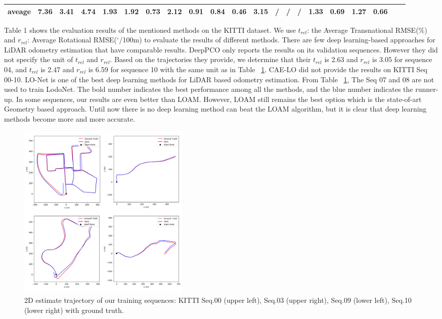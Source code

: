 \documentclass[sigconf]{acmart}
\def\lodo{LodoNet}
\begin{document}
\begin{table}
{\begin{tabular}{|c|cccccccccccccccccc|cc|}
aveage                & 7.36          & 3.41          & 4.74          & 1.93          & 1.92    & 0.73           & 2.12       & 0.91       & \textbf{0.84} & \textbf{0.46} & 3.15           & /              & /            & /            & 1.33            & 0.69     & {\color[HTML]{3166FF} 1.27} & {\color[HTML]{3166FF} 0.66} \\ \hline
\end{tabular}}
\label{tab:results}
\end{table}


Table 1 shows the evaluation results of the mentioned methods on the KITTI dataset. We use $t_{rel}$: the Average Transnational RMSE($\%$) and $r_{rel}$: Average Rotational RMSE($^\circ$/100m) to evaluate the results of different methods. There are few deep learning-based approaches for LiDAR odometry estimation that have comparable results. DeepPCO\cite{DeepPCO} only reports the results on its validation sequences. However they did not specify the unit of $t_{rel}$ and $r_{rel}$. Based on the trajectories they provide, we determine that their $t_{rel}$ is 2.63 and $r_{rel}$ is 3.05 for sequence 04, and  $t_{rel}$ is 2.47 and $r_{rel}$ is 6.59 for sequence 10 with the same unit as in Table ~\ref{tab:results}. CAE-LO\cite{CAE-LO} 
did not provide the results on KITTI Seq 00-10. LO-Net\cite{LO-Net} is one of the best deep learning methods for LiDAR based odometry estimation. From Table ~\ref{tab:results}, The Seq 07 and 08 are not used to train \lodo{}. The bold number indicates the best performance among all the methods, and the blue number indicates the runner-up. In some sequences, our results are even better than LOAM. However, LOAM still remains the best option which is the state-of-art Geometry based approach. Until now there is no deep learning method can beat the LOAM algorithm, but it is clear that deep learning methods become more and more accurate. 

\begin{figure}[h]
\setlength{\abovecaptionskip}{-0.1cm} 
\setlength{\belowcaptionskip}{-0.1cm} 
  \centering
  \includegraphics[width=0.4\textwidth]{Figures/train trajectory.png}
  \caption{\footnotesize{2D estimate trajectory of our training sequences: KITTI Seq.00 (upper left), Seq.03 (upper right), Seq.09 (lower left), Seq.10 (lower right) with ground truth.}}
  \label{fig:train trajectory}
\end{figure}
\end{document}
